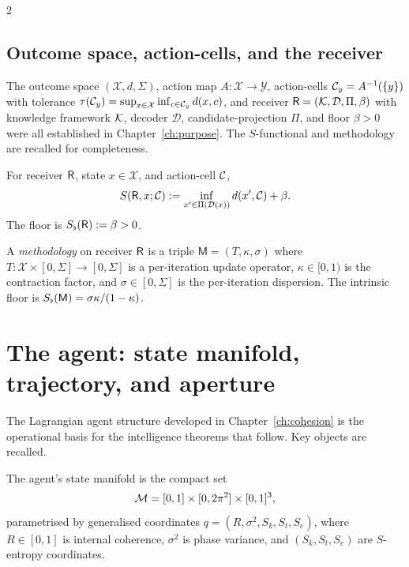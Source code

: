 \begin{multicols}{2}
\subsection{Outcome space, action-cells, and the receiver}

The outcome space $(\mathcal{X}, d, \Sigma)$, action map $A: \mathcal{X} \to \mathcal{Y}$,
action-cells $\mathcal{C}_y = A^{-1}(\{y\})$ with tolerance
$\tau(\mathcal{C}_y) = \sup_{x \in \mathcal{X}} \inf_{c \in \mathcal{C}_y} d(x,c)$, and receiver
$\mathsf{R} = (\mathcal{K}, \mathcal{D}, \Pi, \beta)$ with knowledge framework $\mathcal{K}$, decoder
$\mathcal{D}$, candidate-projection $\Pi$, and floor $\beta > 0$ were all established in
Chapter~\ref{ch:purpose}. The $S$-functional and methodology are recalled for
completeness.

\begin{definition}\label{def:ch05-S}
For receiver $\mathsf{R}$, state $x \in \mathcal{X}$, and action-cell $\mathcal{C}$,
\[
S(\mathsf{R}, x; \mathcal{C}) := \inf_{x' \in \Pi(\mathcal{D}(x))} d(x', \mathcal{C}) + \beta.
\]
The floor is $S_{\flat}(\mathsf{R}) := \beta > 0$.
\end{definition}

\begin{definition}[Methodology]\label{def:ch05-method}
A \emph{methodology} on receiver $\mathsf{R}$ is a triple
$\mathsf{M} = (T, \kappa, \sigma)$ where $T: \mathcal{X} \times [0, \Sigma] \to
[0, \Sigma]$ is a per-iteration update operator, $\kappa \in [0,1)$ is the contraction
factor, and $\sigma \in [0, \Sigma]$ is the per-iteration dispersion. The intrinsic
floor is $S_{\flat}(\mathsf{M}) = \sigma\kappa/(1-\kappa)$.
\end{definition}

\section{The agent: state manifold, trajectory, and aperture}
\label{sec:ch05-agent}

The Lagrangian agent structure developed in Chapter~\ref{ch:cohesion} is the operational
basis for the intelligence theorems that follow. Key objects are recalled.

\begin{definition}\label{def:ch05-manifold}
The agent's state manifold is the compact set
\[
\mathcal{M} = [0,1] \times [0, 2\pi^2] \times [0,1]^3,
\]
parametrised by generalised coordinates $q = (R, \sigma^2, S_k, S_t, S_e)$, where
$R \in [0,1]$ is internal coherence, $\sigma^2$ is phase variance, and
$(S_k, S_t, S_e)$ are $S$-entropy coordinates.
\end{definition}


\end{multicols}
